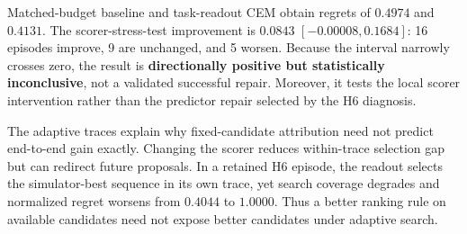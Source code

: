 Matched-budget baseline and task-readout CEM obtain regrets of $0.4974$ and $0.4131$. The scorer-stress-test improvement is $0.0843$ $[-0.00008,0.1684]$: 16 episodes improve, 9 are unchanged, and 5 worsen. Because the interval narrowly crosses zero, the result is \textbf{directionally positive but statistically inconclusive}, not a validated successful repair. Moreover, it tests the local scorer intervention rather than the predictor repair selected by the H6 diagnosis.

The adaptive traces explain why fixed-candidate attribution need not predict end-to-end gain exactly. Changing the scorer reduces within-trace selection gap but can redirect future proposals. In a retained H6 episode, the readout selects the simulator-best sequence in its own trace, yet search coverage degrades and normalized regret worsens from $0.4044$ to $1.0000$. Thus a better ranking rule on available candidates need not expose better candidates under adaptive search.
